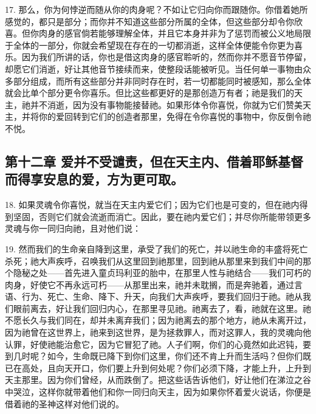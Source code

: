 17. 那么，你为何悖逆而随从你的肉身呢？不如让它归向你而跟随你。你借着她所感觉的，都只是部分；而你并不知道这些部分所属的全体，但这些部分却令你欣喜。但你肉身的感官倘若能够理解全体，并且它本身并非为了惩罚而被公义地局限于全体的一部分，你就会希望现在存在的一切都消逝，这样全体便能令你更为喜乐。因为我们所讲的话，你也是借这肉身的感官聆听的，然而你并不愿音节停留，却愿它们消逝，好让其他音节接续而来，使整段话能被听见。当任何单一事物由众多部分组成，而所有这些部分并非同时存在时，若一切都能同时被感知，那么全体就会比单个部分更令你喜乐。但比这些都更好的是那创造万有者；祂是我们的天主，祂并不消逝，因为没有事物能接替祂。如果形体令你喜悦，你就为它们赞美天主，并将你的爱回转到它们的创造者那里，免得在令你喜悦的事物中，你反倒令祂不悦。\par


\subsection{第十二章 爱并不受谴责，但在天主内、借着耶稣基督而得享安息的爱，方为更可取。}

18. 如果灵魂令你喜悦，就当在天主内爱它们；因为它们也是可变的，但在祂内得到坚固，否则它们就会流逝而消亡。因此，要在祂内爱它们；并尽你所能带领更多灵魂与你一同归向祂，且对他们说：\par

19. 然而我们的生命亲自降到这里，承受了我们的死亡，并以祂生命的丰盛将死亡杀死；祂大声疾呼，召唤我们从这里回到祂那里，回到祂从那里来到我们中间的那个隐秘之处——首先进入童贞玛利亚的胎中，在那里人性与祂结合——我们可朽的肉身，好使它不再永远可朽——从那里出来，祂并未耽搁，而是奔驰着，通过言语、行为、死亡、生命、降下、升天，向我们大声疾呼，要我们回归于祂。祂从我们眼前离去，好让我们回归内心，在那里寻见祂。祂离去了，看，祂就在这里。祂不愿长久与我们同在，却并未离弃我们；因为祂离去的那个地方，祂从未离开过，因为祂曾在这世界上，祂来到这世界，是为拯救罪人，而对这罪人，我的灵魂向他认罪，好使祂能治愈它，因为它冒犯了祂。人子们啊，你们的心竟然如此迟钝，要到几时呢？如今，生命既已降下到你们这里，你们还不肯上升而生活吗？但你们既已在高处，且向天开口，你们要上升到何处呢？你们必须下降，才能上升，上升到天主那里。因为你们曾经，从而跌倒了。把这些话告诉他们，好让他们在涕泣之谷中哭泣，这样你就带着他们和你一同归向天主，因为如果你怀着爱火说话，你便是借着祂的圣神这样对他们说的。\par

